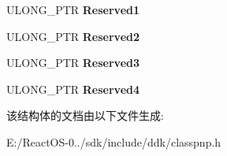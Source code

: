 \begin{DoxyCompactItemize}
U\+L\+O\+N\+G\+\_\+\+P\+TR {\bfseries Reserved1}
\item 
\mbox{\label{struct___f_u_n_c_t_i_o_n_a_l___d_e_v_i_c_e___e_x_t_e_n_s_i_o_n_a73c2c619b895327d495057fef21874d4}} 
U\+L\+O\+N\+G\+\_\+\+P\+TR {\bfseries Reserved2}
\item 
\mbox{\label{struct___f_u_n_c_t_i_o_n_a_l___d_e_v_i_c_e___e_x_t_e_n_s_i_o_n_a024fd64f3f9dcc258b3f732e63452de2}} 
U\+L\+O\+N\+G\+\_\+\+P\+TR {\bfseries Reserved3}
\item 
\mbox{\label{struct___f_u_n_c_t_i_o_n_a_l___d_e_v_i_c_e___e_x_t_e_n_s_i_o_n_aa0a4b5c1a4b0ae0793cba5aff1fdded7}} 
U\+L\+O\+N\+G\+\_\+\+P\+TR {\bfseries Reserved4}
\end{DoxyCompactItemize}


该结构体的文档由以下文件生成\+:\begin{DoxyCompactItemize}
\item 
E\+:/\+React\+O\+S-\/0../sdk/include/ddk/classpnp.\+h\end{DoxyCompactItemize}
